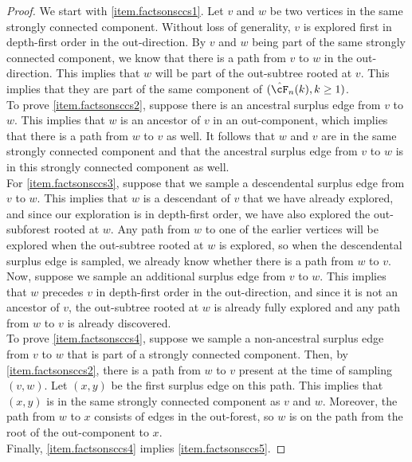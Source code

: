 \begin{proof}
We start with \ref{item.factsonsccs1}. Let $v$ and $w$ be two vertices in the same strongly connected component. Without loss of generality, $v$ is explored first in depth-first order in the out-direction. By $v$ and $w$ being part of the same strongly connected component, we know that there is a path from $v$ to $w$ in the out-direction. This implies that $w$ will be part of the out-subtree rooted at $v$. This implies that they are part of the same component of $(\hat{\cF}_n(k),k\geq 1)$. \\
To prove \ref{item.factsonsccs2}, suppose there is an ancestral surplus edge from $v$ to $w$. This implies that $w$ is an ancestor of $v$ in an out-component, which implies that there is a path from $w$ to $v$ as well. It follows that $w$ and $v$ are in the same strongly connected component and that the ancestral surplus edge from $v$ to $w$ is in this strongly connected component as well. \\
For \ref{item.factsonsccs3}, suppose that we sample a descendental surplus edge from $v$ to $w$. This implies that $w$ is a descendant of $v$ that we have already explored, and since our exploration is in depth-first order, we have also explored the out-subforest rooted at $w$. Any path from $w$ to one of the earlier vertices will be explored when the out-subtree rooted at $w$ is explored, so when the descendental surplus edge is sampled, we already know whether there is a path from $w$ to $v$. Now, suppose we sample an additional surplus edge from $v$ to $w$. This implies that $w$ precedes $v$ in depth-first order in the out-direction, and since it is not an ancestor of $v$, the out-subtree rooted at $w$ is already fully explored and any path from $w$ to $v$ is already discovered. \\
To prove \ref{item.factsonsccs4}, suppose we sample a non-ancestral surplus edge from $v$ to $w$ that is part of a strongly connected component. Then, by \ref{item.factsonsccs2}, there is a path from $w$ to $v$ present at the time of sampling $(v,w)$. Let $(x,y)$ be the first surplus edge on this path. This implies that $(x,y)$ is in the same strongly connected component as $v$ and $w$. Moreover, the path from $w$ to $x$ consists of edges in the out-forest, so $w$ is on the path from the root of the out-component to $x$.\\
Finally, \ref{item.factsonsccs4} implies \ref{item.factsonsccs5}. 
\end{proof}

